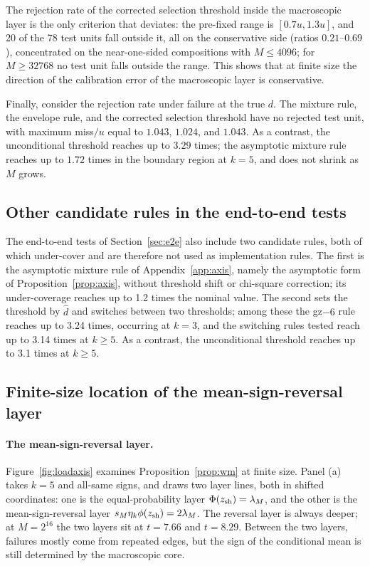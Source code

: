 The rejection rate of the corrected selection threshold inside the macroscopic layer is the only criterion that
deviates: the pre-fixed range is $[0.7u,1.3u]$, and 20 of the 78 test units fall outside it, all on the conservative
side (ratios $0.21$--$0.69$), concentrated on the near-one-sided compositions with $M\le4096$; for $M\ge32768$ no test
unit falls outside the range. This shows that at finite size the direction of the calibration error of the macroscopic
layer is conservative.

Finally, consider the rejection rate under failure at the true $d$. The mixture rule, the envelope rule, and the
corrected selection threshold have no rejected test unit, with maximum miss$/u$ equal to $1.043$, $1.024$, and
$1.043$. As a contrast, the unconditional threshold reaches up to $3.29$ times; the asymptotic mixture rule reaches up
to $1.72$ times in the boundary region at $k=5$, and does not shrink as $M$ grows.
\subsection{Other candidate rules in the end-to-end tests}\label{app:exp-e2e-other}
The end-to-end tests of Section~\ref{sec:e2e} also include two candidate rules, both of which under-cover and are
therefore not used as implementation rules. The first is the asymptotic mixture rule of Appendix~\ref{app:axis},
namely the asymptotic form of Proposition~\ref{prop:axis}, without threshold shift or chi-square correction; its
under-coverage reaches up to 1.2 times the nominal value. The second sets the threshold by $\widehat d$ and switches
between two thresholds; among these the gz$-6$ rule reaches up to 3.24 times, occurring at $k=3$, and the switching
rules tested reach up to 3.14 times at $k\ge5$. As a contrast, the unconditional threshold reaches up to 3.1 times at
$k\ge5$.

\subsection{Finite-size location of the mean-sign-reversal layer}\label{app:exp-wm}
\paragraph{The mean-sign-reversal layer.} Figure~\ref{fig:loadaxis} examines Proposition~\ref{prop:wm} at finite
size. Panel (a) takes $k=5$ and all-same signs, and draws two layer lines, both in shifted coordinates: one is the
equal-probability layer $\Phi(z_{\rm sh})=\lambda_M$, and the other is the mean-sign-reversal layer
$s_M\eta_k\phi(z_{\rm sh})=2\lambda_M$. The reversal layer is always deeper; at $M=2^{16}$ the two layers sit at
$t=7.66$ and $t=8.29$. Between the two layers, failures mostly come from repeated edges, but the sign of the
conditional mean is still determined by the macroscopic core.

